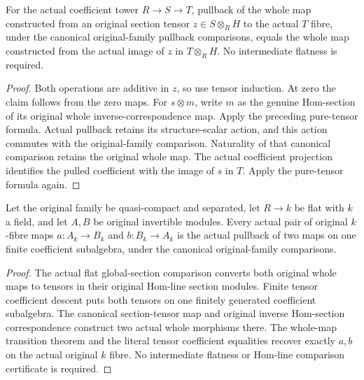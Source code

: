 \begin{theorem}\label{thm:kn-original-line-map-tensor-transition}
\leanok
{}
For the actual coefficient tower $R\to S\to T$, pullback of the whole
map constructed from an original section tensor $z\in S\otimes_R H$
to the actual $T$ fibre, under the canonical original-family pullback
comparisons, equals the whole map constructed from the actual image
of $z$ in $T\otimes_R H$. No intermediate flatness is required.
\end{theorem}
\begin{proof}
Both operations are additive in $z$, so use tensor induction. At zero the
claim follows from the zero maps. For $s\otimes m$, write $m$ as the genuine
Hom-section of its original whole inverse-correspondence map. Apply the
preceding pure-tensor formula. Actual pullback retains its structure-scalar
action, and this action commutes with the original-family comparison.
Naturality of that canonical comparison retains the original whole map.
The actual coefficient projection identifies the pulled coefficient with
the image of $s$ in $T$. Apply the pure-tensor formula again.
\end{proof}

\begin{theorem}\label{thm:kn-original-line-whole-map-finite-descent}
\leanok
{}
Let the original family be quasi-compact and separated, let $R\to k$ be
flat with $k$ a field, and let $A,B$ be original invertible modules.
Every actual pair of original $k$-fibre maps $a:A_k\to B_k$ and
$b:B_k\to A_k$ is the actual pullback of two maps on one finite
coefficient subalgebra, under the canonical original-family comparisons.
\end{theorem}
\begin{proof}
The actual flat global-section comparison converts both original whole
maps to tensors in their original Hom-line section modules. Finite tensor
coefficient descent puts both tensors on one finitely generated coefficient
subalgebra. The canonical section-tensor map and original inverse Hom-section
correspondence construct two actual whole morphisms there. The whole-map
transition theorem and the literal tensor coefficient equalities recover
exactly $a,b$ on the actual original $k$ fibre. No intermediate flatness or
Hom-line comparison certificate is required.
\end{proof}
